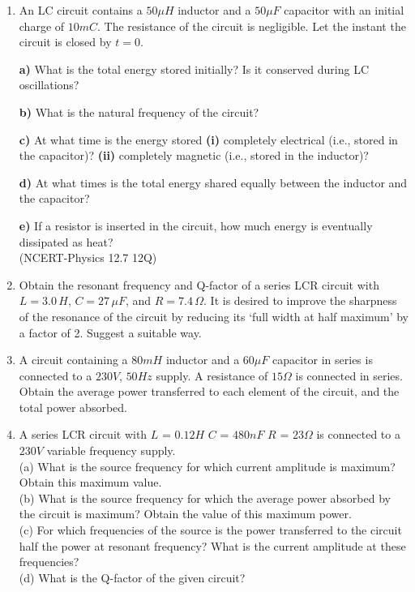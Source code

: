 \begin{enumerate}[label=\thesection.\arabic*,ref=\thesection.\theenumi]
\item An LC circuit contains a $50 \mu H$ inductor and a $50 \mu F$ capacitor with an initial charge of $10 mC$. The resistance of the circuit is negligible. Let the instant the circuit is closed by $t = 0$.

\textbf{a)} What is the total energy stored initially? Is it conserved during LC oscillations?

\textbf{b)} What is the natural frequency of the circuit?

\textbf{c)} At what time is the energy stored \textbf{(i)} completely electrical (i.e., stored in the capacitor)? \textbf{(ii)} completely magnetic (i.e., stored in the inductor)?

\textbf{d)} At what times is the total energy shared equally between the inductor and the capacitor?

\textbf{e)} If a resistor is inserted in the circuit, how much energy is eventually dissipated as heat? \\
\hfill(NCERT-Physics 12.7 12Q)\\
\solution 
\pagebreak 

\item Obtain the resonant frequency and Q-factor of a series LCR circuit with $L = 3.0\, H$, $C = 27\, \mu F$, and $R = 7.4\, \Omega$. It is desired to improve the sharpness of the resonance of the circuit by reducing its `full width at half maximum' by a factor of 2. Suggest a suitable way.\\
\solution


\pagebreak
\item A circuit containing a $80 mH$ inductor and a $60 \mu F$ capacitor in series is connected to a $230 V$, $50 Hz$ supply. A resistance of $15 \Omega $ is connected in series. Obtain the average power transferred to each element of the circuit, and the total power absorbed.\\
\solution
\pagebreak

\item A series LCR circuit with 
$L$ = $0.12 H$
$C$ = $480 nF$
$R$ = $23 \Omega$
is connected to a $230 V$ variable frequency supply.\\
(a) What is the source frequency for which current amplitude is maximum? Obtain this maximum value.\\
(b) What is the source frequency for which the average power absorbed by the circuit is maximum? Obtain the value of this maximum power.\\
(c) For which frequencies of the source is the power transferred to the circuit half the power at resonant frequency? What is the current amplitude at these frequencies?\\
(d) What is the Q-factor of the given circuit?\\
\solution
\pagebreak


\end{enumerate}
